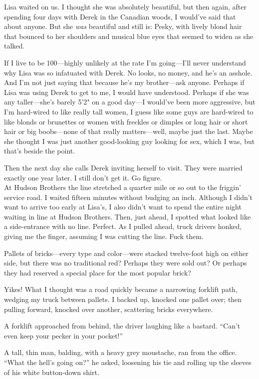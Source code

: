 Lisa waited on us. I thought she was absolutely beautiful, but then
again, after spending four days with Derek in the Canadian woods, I
would've said that about anyone. But she \emph{was} beautiful and still
is: Pesky, with lively blond hair that bounced to her shoulders and
musical blue eyes that seemed to widen as she talked.

If I live to be 100---highly unlikely at the rate I'm going---I'll never
understand why Lisa was so infatuated with Derek. No looks, no money,
and he's an asshole. And I'm not just saying that because he's my
brother---ask anyone. Perhaps if Lisa was using Derek to get to me, I
would have understood. Perhaps if she was any taller---she's barely 5'2"
on a good day---I would've been more aggressive, but I'm hard-wired to
like really tall women, I guess like some guys are hard-wired to like
blonds or brunettes or women with freckles or dimples or long hair or
short hair or big boobs---none of that really matters---well, maybe just
the last. Maybe she thought I was just another good-looking guy looking
for sex, which I was, but that's beside the point.

Then the next day she calls Derek inviting herself to visit. They were
married exactly one year later. I still don't get it. Go figure.\\

At Hudson Brothers the line stretched a quarter mile or so out to the
friggin' service road. I waited fifteen minutes without budging an inch.
Although I didn't want to arrive too early at Lisa's, I also didn't want
to spend the entire night waiting in line at Hudson Brothers. Then, just
ahead, I spotted what looked like a side-entrance with no line. Perfect.
As I pulled ahead, truck drivers honked, giving me the finger, assuming
I was cutting the line. Fuck them.

Pallets of bricks---every type and color---were stacked twelve-foot high
on either side, but there was no traditional red? Perhaps they were sold
out? Or perhaps they had reserved a special place for the most popular
brick?

Yikes! What I thought was a road quickly became a narrowing forklift
path, wedging my truck between pallets. I backed up, knocked one pallet
over; then pulling forward, knocked over another, scattering bricks
everywhere.

A forklift approached from behind, the driver laughing like a bastard.
``Can't even keep your pecker in your pocket!''

A tall, thin man, balding, with a heavy grey moustache, ran from the
office. ``What the hell's going on?'' he asked, loosening his tie and
rolling up the sleeves of his white button-down shirt.


